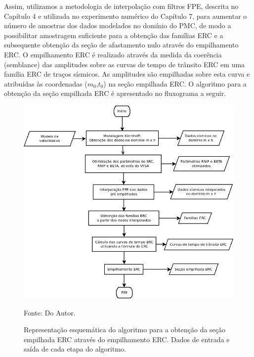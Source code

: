 Assim, utilizamos a metodologia de interpolação com filtros FPE, descrita no Capítulo 4 e utilizada
no experimento numérico do Capítulo 7, para aumentar o número de amostras
dos dados modelados
no domínio do PMC, de modo a possibilitar amostragem suficiente para a
obtenção das famílias ERC e a subsequente obtenção da
seção de afastamento nulo através do empilhamento ERC. O empilhamento ERC
é realizado através da medida da coerência (semblance) das amplitudes sobre as curvas de tempo de trânsito
ERC em uma família ERC de traços sísmicos. As amplitudes são empilhadas sobre esta curva e atribuídas
às coordenadas ($m_0$,$t_0$) na seção empilhada ERC.
O algoritmo para a obtenção da seção empilhada ERC é apresentado no fluxograma a seguir.

\begin{figure}[H]
\caption{Representação esquemática do algoritmo para a obtenção da seção empilhada ERC
através do empilhamento ERC. Dados de entrada e saída de cada etapa do algoritmo.}
\begin{center}
\includegraphics[scale=0.5]{images/fluxoemperc.png}
\vspace{-0.3cm}
\end{center}
\begin{center}
 Fonte: Do Autor.
\end{center}
\label{alg:9.1}
\end{figure}


